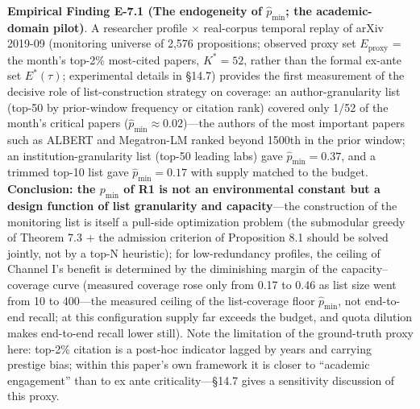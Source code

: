 \documentclass[
  11pt]{article}
\begin{document}
\textbf{Empirical Finding E-7.1 (The endogeneity of \(\hat p_{\min}\);
the academic-domain pilot)}. A researcher profile × real-corpus temporal
replay of arXiv 2019-09 (monitoring universe of 2,576 propositions;
observed proxy set \(E_{\mathrm{proxy}}\) = the month's top-2\%
most-cited papers, \(K^*=52\), rather than the formal ex-ante set
\(E^*(\tau)\); experimental details in §14.7) provides the first
measurement of the decisive role of list-construction strategy on
coverage: an author-granularity list (top-50 by prior-window frequency
or citation rank) covered only 1/52 of the month's critical papers
(\(\hat p_{\min}\approx0.02\))---the authors of the most important
papers such as ALBERT and Megatron-LM ranked beyond 1500th in the prior
window; an institution-granularity list (top-50 leading labs) gave
\(\hat p_{\min}=0.37\), and a trimmed top-10 list gave
\(\hat p_{\min}=0.17\) with supply matched to the budget.
\textbf{Conclusion: the \(p_{\min}\) of R1 is not an environmental
constant but a design function of list granularity and capacity}---the
construction of the monitoring list is itself a pull-side optimization
problem (the submodular greedy of Theorem 7.3 + the admission criterion
of Proposition 8.1 should be solved jointly, not by a top-N heuristic);
for low-redundancy profiles, the ceiling of Channel I's benefit is
determined by the diminishing margin of the capacity--coverage curve
(measured coverage rose only from 0.17 to 0.46 as list size went from 10
to 400---the measured ceiling of the list-coverage floor
\(\hat p_{\min}\), not end-to-end recall; at this configuration supply
far exceeds the budget, and quota dilution makes end-to-end recall lower
still). Note the limitation of the ground-truth proxy here: top-2\%
citation is a post-hoc indicator lagged by years and carrying prestige
bias; within this paper's own framework it is closer to ``academic
engagement'' than to ex ante criticality---§14.7 gives a sensitivity
discussion of this proxy.
\end{document}
